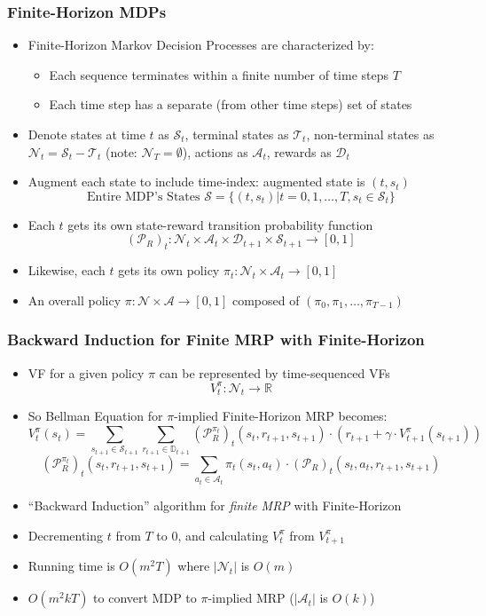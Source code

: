 \documentclass[handout]{beamer}
\begin{document}
\begin{frame}
\frametitle{Finite-Horizon MDPs}
\pause
\begin{itemize}[<+->]
\item Finite-Horizon Markov Decision Processes are characterized by:
\begin{itemize}
\item Each sequence terminates within a finite number of time steps $T$
\item Each time step has a separate (from other time steps) set of states
\end{itemize} 
\item Denote states at time $t$ as $\mathcal{S}_t$, terminal states as $\mathcal{T}_t$,  non-terminal states as $\mathcal{N}_t = \mathcal{S}_t - \mathcal{T}_t$ (note: $\mathcal{N}_T = \emptyset$), actions as $\mathcal{A}_t$, rewards as $\mathcal{D}_t$
\item Augment each state to include time-index: augmented state is $(t, s_t)$
$$\text{Entire MDP's States } \mathcal{S} = \{(t, s_t) | t = 0, 1, \ldots, T, s_t \in \mathcal{S}_t\}$$
\item Each $t$ gets its own state-reward transition probability function
$$(\mathcal{P}_R)_t: \mathcal{N}_t \times \mathcal{A}_t \times \mathcal{D}_{t+1} \times \mathcal{S}_{t+1} \rightarrow [0, 1]$$
\item Likewise, each $t$ gets its own policy $\pi_t: \mathcal{N}_t \times \mathcal{A}_t \rightarrow [0, 1]$
\item An overall policy $\pi: \mathcal{N} \times \mathcal{A} \rightarrow [0,1]$ composed of $(\pi_0, \pi_1, \ldots, \pi_{T-1})$
\end{itemize}
\end{frame}

\begin{frame}
\frametitle{Backward Induction for Finite MRP with Finite-Horizon}
\pause
\begin{itemize}[<+->]
\item VF for a given policy $\pi$ can be represented by time-sequenced VFs
$$V^{\pi}_t: \mathcal{N}_t \rightarrow \mathbb{R}$$
\item So Bellman Equation for $\pi$-implied Finite-Horizon MRP becomes:
$$V^{\pi}_t(s_t) = \sum_{s_{t+1} \in \mathcal{S}_{t+1}} \sum_{r_{t+1} \in \mathbb{D}_{t+1}} (\mathcal{P}_R^{\pi_t})_t(s_t, r_{t+1}, s_{t+1}) \cdot (r_{t+1} + \gamma \cdot V^{\pi}_{t+1}(s_{t+1}))$$
$$(\mathcal{P}_R^{\pi_t})_t(s_t, r_{t+1}, s_{t+1}) = \sum_{a_t \in \mathcal{A}_t} \pi_t(s_t, a_t) \cdot (\mathcal{P}_R)_t(s_t, a_t, r_{t+1}, s_{t+1})$$
\item ``Backward Induction'' algorithm for {\em finite MRP} with Finite-Horizon
\item Decrementing $t$ from $T$ to 0, and calculating $V_t^{\pi}$ from $V_{t+1}^{\pi}$
\item Running time is $O(m^2 T)$ where $|\mathcal{N}_t|$ is $O(m)$
\item $O(m^2 k T)$ to convert MDP to $\pi$-implied MRP ($|\mathcal{A}_t|$ is $O(k)$)
\end{itemize}
\end{frame}
\end{document}
